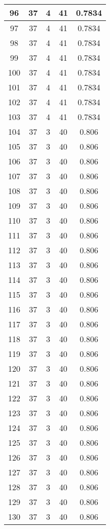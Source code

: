 \documentclass[letterpaper, 12pt]{article}
\begin{document}
\begin{longtable}{|c|c|c|c|c|}
\hline
96 & 37 & 4 & 41 & 0.7834 \\
\hline
97 & 37 & 4 & 41 & 0.7834 \\
\hline
98 & 37 & 4 & 41 & 0.7834 \\
\hline
99 & 37 & 4 & 41 & 0.7834 \\
\hline
100 & 37 & 4 & 41 & 0.7834 \\
\hline
101 & 37 & 4 & 41 & 0.7834 \\
\hline
102 & 37 & 4 & 41 & 0.7834 \\
\hline
103 & 37 & 4 & 41 & 0.7834 \\
\hline
104 & 37 & 3 & 40 & 0.806 \\
\hline
105 & 37 & 3 & 40 & 0.806 \\
\hline
106 & 37 & 3 & 40 & 0.806 \\
\hline
107 & 37 & 3 & 40 & 0.806 \\
\hline
108 & 37 & 3 & 40 & 0.806 \\
\hline
109 & 37 & 3 & 40 & 0.806 \\
\hline
110 & 37 & 3 & 40 & 0.806 \\
\hline
111 & 37 & 3 & 40 & 0.806 \\
\hline
112 & 37 & 3 & 40 & 0.806 \\
\hline
113 & 37 & 3 & 40 & 0.806 \\
\hline
114 & 37 & 3 & 40 & 0.806 \\
\hline
115 & 37 & 3 & 40 & 0.806 \\
\hline
116 & 37 & 3 & 40 & 0.806 \\
\hline
117 & 37 & 3 & 40 & 0.806 \\
\hline
118 & 37 & 3 & 40 & 0.806 \\
\hline
119 & 37 & 3 & 40 & 0.806 \\
\hline
120 & 37 & 3 & 40 & 0.806 \\
\hline
121 & 37 & 3 & 40 & 0.806 \\
\hline
122 & 37 & 3 & 40 & 0.806 \\
\hline
123 & 37 & 3 & 40 & 0.806 \\
\hline
124 & 37 & 3 & 40 & 0.806 \\
\hline
125 & 37 & 3 & 40 & 0.806 \\
\hline
126 & 37 & 3 & 40 & 0.806 \\
\hline
127 & 37 & 3 & 40 & 0.806 \\
\hline
128 & 37 & 3 & 40 & 0.806 \\
\hline
129 & 37 & 3 & 40 & 0.806 \\
\hline
130 & 37 & 3 & 40 & 0.806 \\

\end{longtable}
\end{document}
